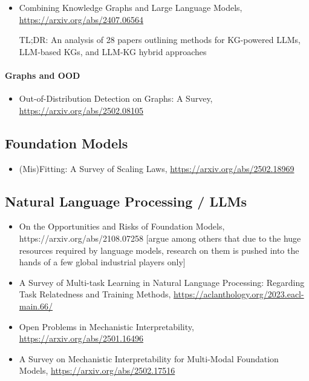 \begin{itemize}
\item Combining Knowledge Graphs and Large Language Models, \url{https://arxiv.org/abs/2407.06564}

TL;DR: An analysis of 28 papers outlining methods for KG-powered LLMs, LLM-based KGs, and LLM-KG hybrid approaches
\end{itemize}

\paragraph{Graphs and OOD}

\begin{itemize}
\item Out-of-Distribution Detection on Graphs: A Survey,
\url{https://arxiv.org/abs/2502.08105}
\end{itemize}


\subsection{Foundation Models}

\begin{itemize}
\item \New (Mis)Fitting: A Survey of Scaling Laws, \url{https://arxiv.org/abs/2502.18969}
\end{itemize}

\subsection{Natural Language Processing / LLMs}

\begin{itemize}
\item On the Opportunities and Risks of Foundation Models, https://arxiv.org/abs/2108.07258 [argue among others that due to the huge resources required by language models, research on them is pushed into the hands of a few global industrial players only]


\item \New A Survey of Multi-task Learning in Natural Language Processing: Regarding Task Relatedness and Training Methods, \url{https://aclanthology.org/2023.eacl-main.66/}

\item \New Open Problems in Mechanistic Interpretability, \url{https://arxiv.org/abs/2501.16496}

\item \New A Survey on Mechanistic Interpretability for Multi-Modal Foundation Models, \url{https://arxiv.org/abs/2502.17516}
\end{itemize}

